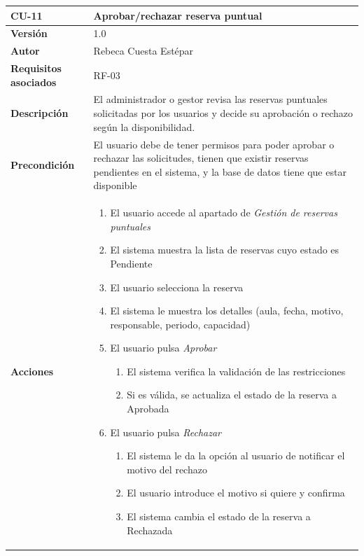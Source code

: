 \begin{table}[p]
	\centering
	\begin{tabularx}{\linewidth}{ p{} p{} }
		\toprule
		\textbf{CU-11}    & \textbf{Aprobar/rechazar reserva puntual}\\
		\toprule
		\textbf{Versión}              & 1.0    \\
		\textbf{Autor}                & Rebeca Cuesta Estépar \\
		\textbf{Requisitos asociados} & RF-03 \\
		\textbf{Descripción}          & El administrador o gestor revisa las reservas puntuales solicitadas por los usuarios y decide su aprobación o rechazo según la disponibilidad. \\
		\textbf{Precondición}         &  El usuario debe de tener permisos para poder aprobar o rechazar las solicitudes, tienen que existir reservas pendientes en el sistema, y la base de datos tiene que estar disponible\\
		\textbf{Acciones}             &
		\begin{enumerate}
			\def\labelenumi{\arabic{enumi}.}
			\tightlist
			\item El usuario accede al apartado de \emph{Gestión de reservas puntuales}
			\item El sistema muestra la lista de reservas cuyo estado es Pendiente
			\item El usuario selecciona la reserva
			\item El sistema le muestra los detalles (aula, fecha, motivo, responsable, periodo, capacidad)
			\item El usuario pulsa \emph{Aprobar}
			\begin{enumerate}[label*=\arabic*., itemsep=0.5pt, topsep=0.5pt, leftmargin=1em]
				\tightlist
				\item El sistema verifica la validación de las restricciones 
				\item Si es válida, se actualiza el estado de la reserva a Aprobada
			\end{enumerate}
			\item El usuario pulsa \emph{Rechazar}
			\begin{enumerate}[label*=\arabic*., itemsep=0.5pt, topsep=0.5pt, leftmargin=1em]
				\tightlist
				\item El sistema le da la opción al usuario de notificar el motivo del rechazo 
				\item El usuario introduce el motivo si quiere y confirma
				\item El sistema cambia el estado de la reserva a Rechazada
			\end{enumerate}
			

\end{enumerate}
\end{tabularx}
\end{table}
